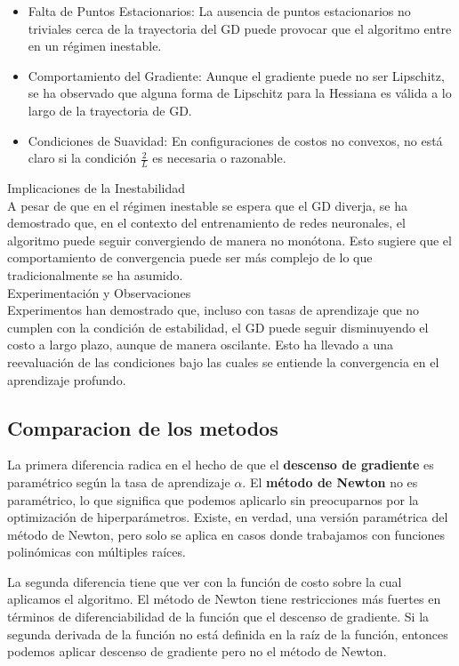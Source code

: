\documentclass[conference]{IEEEtran}
\begin{document}
\begin{itemize}
    \item Falta de Puntos Estacionarios: La ausencia de puntos estacionarios no triviales cerca de la trayectoria del GD puede provocar que el algoritmo entre en un régimen inestable.
    
    \item Comportamiento del Gradiente: Aunque el gradiente puede no ser Lipschitz, se ha observado que alguna forma de Lipschitz para la Hessiana es válida a lo largo de la trayectoria de GD.
    
    \item Condiciones de Suavidad: En configuraciones de costos no convexos, no está claro si la condición $\frac{2}{L}$ es necesaria o razonable.
\end{itemize}

Implicaciones de la Inestabilidad\\
A pesar de que en el régimen inestable se espera que el GD diverja, se ha demostrado que, en el contexto del entrenamiento de redes neuronales, el algoritmo puede seguir convergiendo de manera no monótona. Esto sugiere que el comportamiento de convergencia puede ser más complejo de lo que tradicionalmente se ha asumido. \\

Experimentación y Observaciones\\
Experimentos han demostrado que, incluso con tasas de aprendizaje que no cumplen con la condición de estabilidad, el GD puede seguir disminuyendo el costo a largo plazo, aunque de manera oscilante. Esto ha llevado a una reevaluación de las condiciones bajo las cuales se entiende la convergencia en el aprendizaje profundo.

\subsection{Comparacion de los metodos}
La primera diferencia radica en el hecho de que el \textbf{descenso de gradiente} es paramétrico según la tasa de aprendizaje $\alpha$. El \textbf{método de Newton} no es paramétrico, lo que significa que podemos aplicarlo sin preocuparnos por la optimización de hiperparámetros. Existe, en verdad, una versión paramétrica del método de Newton, pero solo se aplica en casos donde trabajamos con funciones polinómicas con múltiples raíces.

La segunda diferencia tiene que ver con la función de costo sobre la cual aplicamos el algoritmo. El método de Newton tiene restricciones más fuertes en términos de diferenciabilidad de la función que el descenso de gradiente. Si la segunda derivada de la función no está definida en la raíz de la función, entonces podemos aplicar descenso de gradiente pero no el método de Newton.
\end{document}
